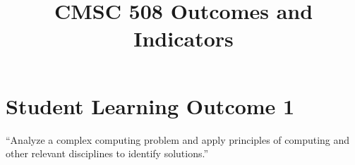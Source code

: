 \documentclass[
  letterpaper,
  DIV=11,
  numbers=noendperiod]{scrartcl}
\title{CMSC 508 Outcomes and Indicators}
\author{}
\date{}
\renewcommand*\contentsname{Table of contents}
\newcommand\contentsname{Table of contents}
\begin{document}
\maketitle
\ifdefined\Shaded\renewenvironment{Shaded}{\begin{tcolorbox}[boxrule=0pt, borderline west={3pt}{0pt}{shadecolor}, sharp corners, breakable, interior hidden, frame hidden, enhanced]}{\end{tcolorbox}}\fi

\renewcommand*\contentsname{Table of contents}
{
\hypersetup{linkcolor=}
\setcounter{tocdepth}{3}
\tableofcontents
}
\hypertarget{student-learning-outcome-1}{%
\section{Student Learning Outcome 1}\label{student-learning-outcome-1}}

``Analyze a complex computing problem and apply principles of computing
and other relevant disciplines to identify solutions.''
\end{document}
